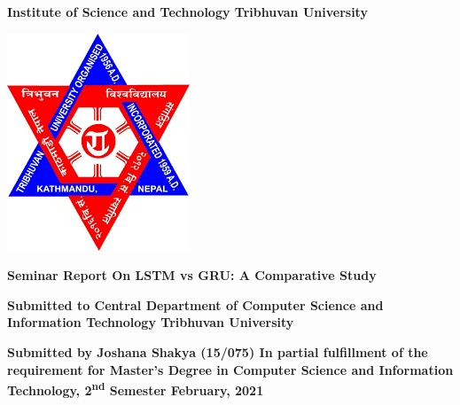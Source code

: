 
\begin{center}
	\textbf{
		\Large
		Institute of Science and Technology
		\linebreak
		Tribhuvan University
	}
\end{center}

\vspace{1.5cm}

\begin{center}
	\includegraphics[scale=0.4]{resources/logo.png}
\end{center}

\vspace{1.5cm}

\begin{center}
	\textbf{
		\large
		Seminar Report 
		\linebreak
		On
		\linebreak
		LSTM vs GRU: A Comparative Study
	}
\end{center}

\vspace{1.5cm}

\begin{center}
	\textbf{
		\large
		Submitted to 
		\linebreak
		Central Department of Computer Science and Information Technology
		\linebreak
		Tribhuvan University
	}
\end{center}

\vspace{1.5cm}

\begin{center}
	\textbf{
		\large
		Submitted by
		\linebreak
		Joshana Shakya (15/075)
		\linebreak
		In partial fulfillment of the requirement for Master's Degree in Computer Science and Information Technology, 2\textsuperscript{nd} Semester
		\linebreak
		February, 2021
	}
\end{center}

\clearpage